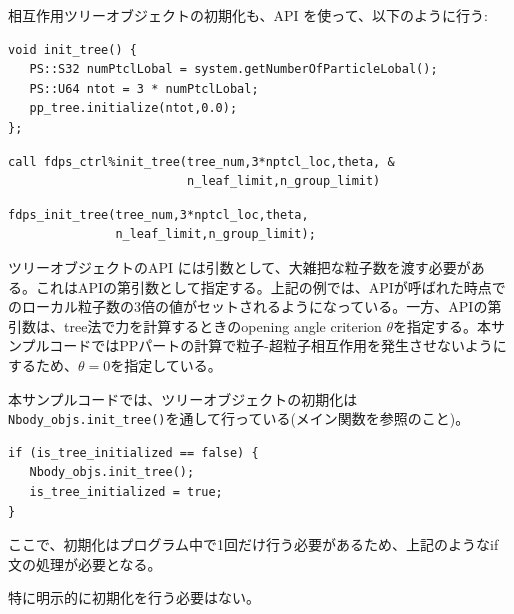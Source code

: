 \begin{description}[leftmargin=*]
\item[(iii) ツリーオブジェクトの初期化]
相互作用ツリーオブジェクトの初期化も、API を使って、以下のように行う:
\ifCpp
\begin{lstlisting}[caption=ツリーオブジェクトの初期化]
void init_tree() {
   PS::S32 numPtclLobal = system.getNumberOfParticleLobal();
   PS::U64 ntot = 3 * numPtclLobal;
   pp_tree.initialize(ntot,0.0);
}; 
\end{lstlisting}
\endifCpp
\ifFtn
\begin{lstlisting}[caption=ツリーオブジェクトの初期化]
call fdps_ctrl%init_tree(tree_num,3*nptcl_loc,theta, &
                         n_leaf_limit,n_group_limit)
\end{lstlisting}
\endifFtn
\ifC
\begin{lstlisting}[caption=ツリーオブジェクトの初期化]
fdps_init_tree(tree_num,3*nptcl_loc,theta,
               n_leaf_limit,n_group_limit);
\end{lstlisting}
\endifC
ツリーオブジェクトのAPI には引数として、大雑把な粒子数を渡す必要がある。これはAPIの第引数として指定する。上記の例では、APIが呼ばれた時点でのローカル粒子数の3倍の値がセットされるようになっている。一方、APIの第引数は、tree法で力を計算するときのopening angle criterion $\theta$を指定する。本サンプルコードではPPパートの計算で粒子-超粒子相互作用を発生させないようにするため、$\theta=0$を指定している。

\ifCpp
本サンプルコードでは、ツリーオブジェクトの初期化は\texttt{Nbody\_objs.init\_tree()}を通して行っている(メイン関数を参照のこと)。
\begin{lstlisting}
if (is_tree_initialized == false) {
   Nbody_objs.init_tree();
   is_tree_initialized = true;
}
\end{lstlisting}
ここで、初期化はプログラム中で1回だけ行う必要があるため、上記のようなif文の処理が必要となる。
\endifCpp


\item[(iv) ParticleMeshオブジェクトの初期化] 特に明示的に初期化を行う必要はない。

\end{description}

